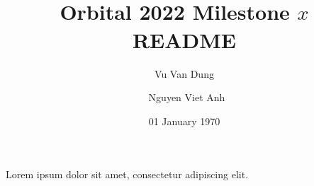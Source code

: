\documentclass[11pt]{article}
\title{\\[1cm]\bfseries Orbital 2022 Milestone $x$ README}
\author{Vu Van Dung \and\ Nguyen Viet Anh}
\date{01 January 1970}
\begin{document}
\maketitle
\tableofcontents
\setlength\parindent{0pt}
\setlength\parskip{1em}
\begin{markdown}
Lorem ipsum dolor sit amet, consectetur adipiscing elit.
\end{markdown}
\end{document}
